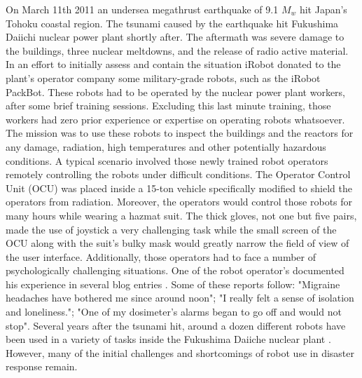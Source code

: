 \documentclass[a4paper,12pt,oneside,openright]{bhamthesis}
\begin{document}
On March 11th 2011 an undersea megathrust earthquake of 9.1 $M_w$ hit Japan's Tohoku coastal region. The tsunami caused by the earthquake hit Fukushima Daiichi nuclear power plant shortly after. The aftermath was severe damage to the buildings, three nuclear meltdowns, and the release of radio active material. In an effort to initially assess and contain the situation iRobot donated to the plant's operator company some military-grade robots, such as the iRobot PackBot. These robots had to be operated by the nuclear power plant workers, after some brief training sessions. Excluding this last minute training, those workers had zero prior experience or expertise on operating robots whatsoever. The mission was to use these robots to inspect the buildings and the reactors for any damage, radiation, high temperatures and other potentially hazardous conditions. A typical scenario involved those newly trained robot operators remotely controlling the robots under difficult conditions. The Operator Control Unit (OCU) was placed inside a 15-ton vehicle specifically modified to shield the operators from radiation. Moreover, the operators would control those robots for many hours while wearing a hazmat suit. The thick gloves, not one but five pairs, made the use of joystick a very challenging task while the small screen of the OCU along with the suit's bulky mask would greatly narrow the field of view of the user interface. Additionally, those operators had to face a number of psychologically challenging situations. One of the robot operator's documented his experience in several blog entries \citep{fuku_blog}. Some of these reports follow: "Migraine headaches have bothered me since around noon"; "I really felt a sense of isolation and loneliness."; "One of my dosimeter's alarms began to go off and would not stop". Several years after the tsunami hit, around a dozen different robots have been used in a variety of tasks inside the Fukushima Daiiche nuclear plant \citep{fuku_science}. However, many of the initial challenges and shortcomings of robot use in disaster response remain.
\end{document}
